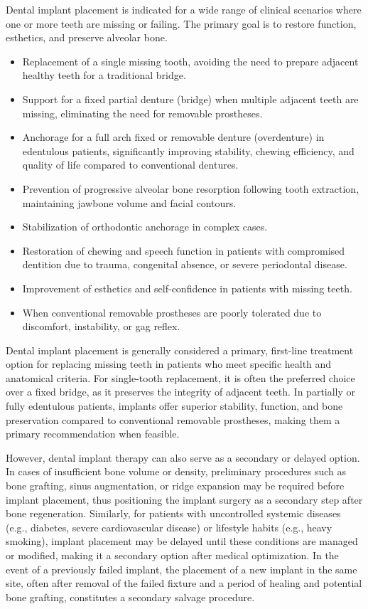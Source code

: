 Dental implant placement is indicated for a wide range of clinical scenarios where one or more teeth are missing or failing. The primary goal is to restore function, esthetics, and preserve alveolar bone.

\begin{itemize}
  \item Replacement of a single missing tooth, avoiding the need to prepare adjacent healthy teeth for a traditional bridge.
  \item Support for a fixed partial denture (bridge) when multiple adjacent teeth are missing, eliminating the need for removable prostheses.
  \item Anchorage for a full arch fixed or removable denture (overdenture) in edentulous patients, significantly improving stability, chewing efficiency, and quality of life compared to conventional dentures.
  \item Prevention of progressive alveolar bone resorption following tooth extraction, maintaining jawbone volume and facial contours.
  \item Stabilization of orthodontic anchorage in complex cases.
  \item Restoration of chewing and speech function in patients with compromised dentition due to trauma, congenital absence, or severe periodontal disease.
  \item Improvement of esthetics and self-confidence in patients with missing teeth.
  \item When conventional removable prostheses are poorly tolerated due to discomfort, instability, or gag reflex.
\end{itemize}

Dental implant placement is generally considered a primary, first-line treatment option for replacing missing teeth in patients who meet specific health and anatomical criteria. For single-tooth replacement, it is often the preferred choice over a fixed bridge, as it preserves the integrity of adjacent teeth. In partially or fully edentulous patients, implants offer superior stability, function, and bone preservation compared to conventional removable prostheses, making them a primary recommendation when feasible.

However, dental implant therapy can also serve as a secondary or delayed option. In cases of insufficient bone volume or density, preliminary procedures such as bone grafting, sinus augmentation, or ridge expansion may be required before implant placement, thus positioning the implant surgery as a secondary step after bone regeneration. Similarly, for patients with uncontrolled systemic diseases (e.g., diabetes, severe cardiovascular disease) or lifestyle habits (e.g., heavy smoking), implant placement may be delayed until these conditions are managed or modified, making it a secondary option after medical optimization. In the event of a previously failed implant, the placement of a new implant in the same site, often after removal of the failed fixture and a period of healing and potential bone grafting, constitutes a secondary salvage procedure.


